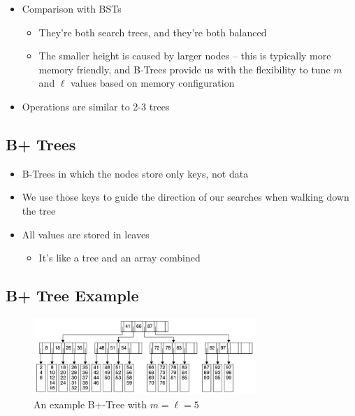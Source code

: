 \documentclass[
  10pt,
  english,
  letterpaper,
,tablecaptionabove
]{scrartcl}
\providecommand{\tightlist}{%
  \setlength{\itemsep}{0pt}\setlength{\parskip}{0pt}}
\begin{document}
\begin{itemize}
\tightlist
\item
  Comparison with BSTs

  \begin{itemize}
  \tightlist
  \item
    They're both search trees, and they're both balanced
  \item
    The smaller height is caused by larger nodes -- this is typically
    more memory friendly, and B-Trees provide us with the flexibility to
    tune \(m\) and \(\ell\) values based on memory configuration
  \end{itemize}
\item
  Operations are similar to 2-3 trees
\end{itemize}

\hypertarget{b-trees-1}{%
\subsection{B+ Trees}\label{b-trees-1}}

\begin{itemize}
\tightlist
\item
  B-Trees in which the nodes store only keys, not data
\item
  We use those keys to guide the direction of our searches when walking
  down the tree
\item
  All values are stored in leaves

  \begin{itemize}
  \tightlist
  \item
    It's like a tree and an array combined
  \end{itemize}
\end{itemize}

\hypertarget{b-tree-example}{%
\subsection{B+ Tree Example}\label{b-tree-example}}

\begin{figure}
\centering
\includegraphics[width=0.75\textwidth,height=\textheight]{images/4.png}
\caption{An example B+-Tree with \(m=\ell=5\)}
\end{figure}
\end{document}
